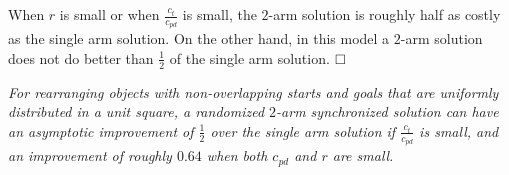 
When $r$ is small or when $\frac{c_t}{c_{pd}}$ is small, the $2$-arm 
solution is roughly half as costly as the single arm solution. On 
the other hand, in this model a $2$-arm solution does not do better than $\frac{1}{2}$ of the single arm solution. $ \qed $



















\begin{theorem}
	\textit{For rearranging objects with non-overlapping starts and goals that are 
	uniformly distributed in a unit square,  a randomized $2$-arm \textit{synchronized} solution can have an 
	asymptotic improvement of $\frac{1}{2}$ over the single arm solution if $\frac{c_t}{c_{pd}}$ is small, and an improvement of roughly $0.64$ when both $c_{pd}$ and $r$ are small. }
\label{thm:syncproof}
\end{theorem}


